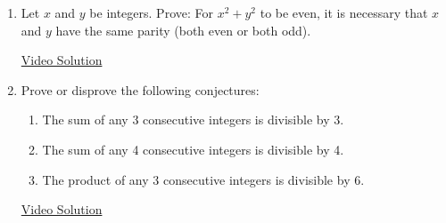 
\begin{enumerate}
  \item Let $x$ and $y$ be integers. Prove: For $x^2+y^2$ to be even, it is necessary that $x$ and $y$ have the same parity (both even or both odd).
  
  \href{https://youtu.be/X3LG7pfEY_c}{Video Solution}
  
  
  \item Prove or disprove the following conjectures:
	\begin{enumerate}
	  \item The sum of any 3 consecutive integers is divisible by 3.
	  \item The sum of any 4 consecutive integers is divisible by 4.
	  \item The product of any 3 consecutive integers is divisible by 6.
	\end{enumerate}
	
  \href{https://youtu.be/R5zpsZoR16w}{Video Solution}
\end{enumerate}